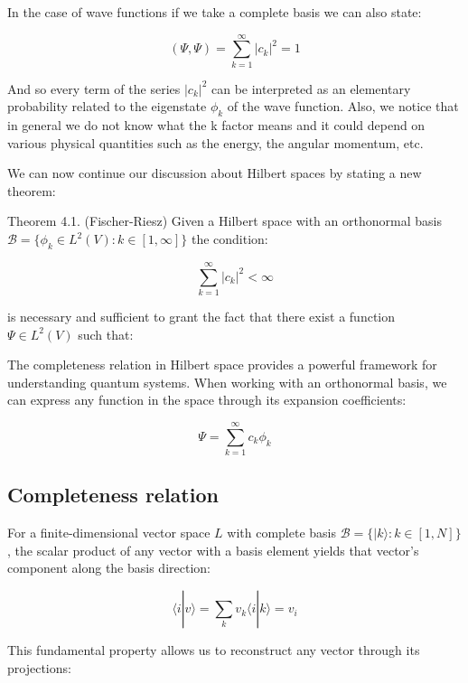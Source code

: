 \documentclass[italian]{HKNdocument}
\begin{document}
In the case of wave functions if we take a complete basis we can also state:

\begin{equation}
(\Psi, \Psi) = \sum_{k=1}^{\infty}|c_k|^2 = 1 \label{eq:4.21}
\end{equation}

And so every term of the series $|c_k|^2$ can be interpreted as an elementary probability related to the eigenstate $\phi_k$ of the wave function. Also, we notice that in general we do not know what the k factor means and it could depend on various physical quantities such as the energy, the angular momentum, etc.

We can now continue our discussion about Hilbert spaces by stating a new theorem:

Theorem 4.1. (Fischer-Riesz) Given a Hilbert space with an orthonormal basis $\mathcal{B} = \{\phi_k \in L^2(V): k \in [1,\infty]\}$ the condition:

\begin{equation}
\sum_{k=1}^{\infty}|c_k|^2 < \infty \label{eq:4.22}
\end{equation}

is necessary and sufficient to grant the fact that there exist a function $\Psi \in L^2(V)$ such that:


The completeness relation in Hilbert space provides a powerful framework for understanding quantum systems. When working with an orthonormal basis, we can express any function in the space through its expansion coefficients:

\begin{equation}
\Psi = \sum_{k=1}^{\infty} c_k\phi_k \label{eq:4.23}
\end{equation}

\subsection{Completeness relation}

For a finite-dimensional vector space $L$ with complete basis $\mathcal{B} = \{|k\rangle: k \in [1,N]\}$, the scalar product of any vector with a basis element yields that vector's component along the basis direction:

\begin{equation}
\langle i|v\rangle = \sum_k v_k\langle i|k\rangle = v_i \label{eq:4.24}
\end{equation}

This fundamental property allows us to reconstruct any vector through its projections:
\end{document}
